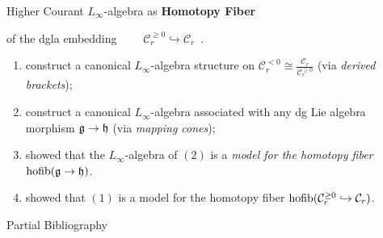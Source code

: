 \documentclass[beamer,10pt,handout]{standalone}  \Handouttrue
\begin{document}



\begin{frame}{Higher Courant $L_\infty$-algebra as \textbf{Homotopy Fiber}}
	\begin{propblock} of the dgla embedding $\qquad \mathcal{C}_r^{\geq 0} \hookrightarrow \mathcal{C}_r$~.
	\end{propblock}
	\begin{proofblock}
\begin{enumerate}[(1)]
		\item \cite{Getzler1991} construct a canonical $L_\infty$-algebra structure on $\mathcal{C}_r^{<0}\cong \frac{\mathcal{C}_r }{\mathcal{C}_r^{\geq 0}}$ (via \emph{derived brackets});
		\item \cite{Fiorenza2006} construct a canonical $L_\infty$-algebra associated with any dg Lie algebra morphism $\mathfrak{g} \to \mathfrak{h}$ (via \emph{mapping cones});
		\item \cite{Pridham2010a} showed that the $L_\infty$-algebra  of $(2)$ is a \emph{model for the homotopy fiber $\mathrm{hofib}(\mathfrak{g} \to \mathfrak{h})$}.
		\item \cite{Bandiera2015} showed that $(1)$ is a model for the homotopy fiber $\mathrm{hofib}(\mathcal{C}_r^{\geq 0} \hookrightarrow \mathcal{C}_r)$.
	\end{enumerate}
	\end{proofblock}
 
\end{frame}









\ifstandalone
\begin{frame}[t,allowframebreaks]{Partial Bibliography}
	\nocite{Miti2021}
	
	
\end{frame}
\fi
\end{document}

